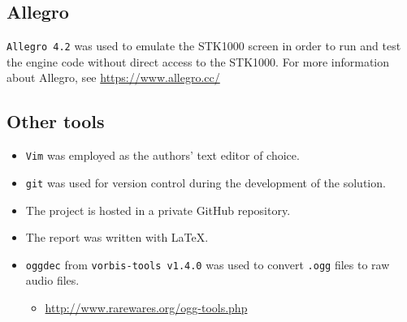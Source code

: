 \subsection{Allegro}
	\texttt{Allegro 4.2} was used to emulate the STK1000 screen in order to run and test the engine code without direct access to the STK1000.
	For more information about Allegro, see \url{https://www.allegro.cc/}

\subsection{Other tools}
	\begin{itemize}
		\item{\texttt{Vim} was employed as the authors' text editor of choice.}
		\item{\texttt{git} was used for version control during the development of the solution.}
		\item{The project is hosted in a private GitHub repository.}
		\item{The report was written with \LaTeX.}
		\item{\texttt{oggdec} from \texttt{vorbis-tools v1.4.0} was used to convert \texttt{.ogg} files to raw audio files.}
		\begin{itemize}
				\item{\url{http://www.rarewares.org/ogg-tools.php}}
		\end{itemize}
	\end{itemize}